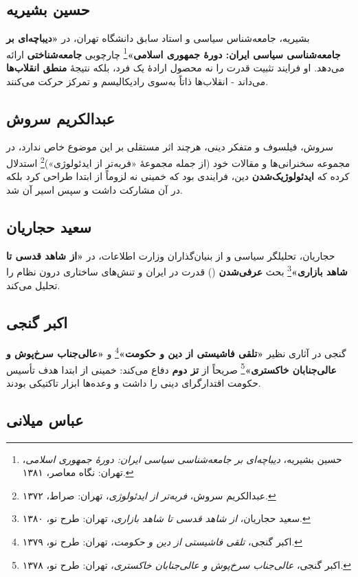 \documentclass[12pt,a4paper]{book}
\newcommand{\keyword}[1]{\textbf{\textcolor{cPrimary}{#1}}}
\newcommand{\en}[1]{\lr{\textit{#1}}}
\begin{document}
\subsection{حسین بشیریه}

بشیریه، جامعه‌شناس سیاسی و استاد سابق دانشگاه تهران، در \textbf{«دیباچه‌ای بر جامعه‌شناسی سیاسی ایران: دورهٔ جمهوری اسلامی»}\footnote{حسین بشیریه، \textit{دیباچه‌ای بر جامعه‌شناسی سیاسی ایران: دورهٔ جمهوری اسلامی}، تهران: نگاه معاصر، ۱۳۸۱.} چارچوبی \keyword{جامعه‌شناختی} ارائه می‌دهد. او فرایند تثبیت قدرت را نه محصول ارادهٔ یک فرد، بلکه نتیجهٔ \keyword{منطق انقلاب‌ها} می‌داند - انقلاب‌ها ذاتاً به‌سوی رادیکالیسم و تمرکز حرکت می‌کنند.

\subsection{عبدالکریم سروش}

سروش، فیلسوف و متفکر دینی، هرچند اثر مستقلی بر این موضوع خاص ندارد، در مجموعه سخنرانی‌ها و مقالات خود (از جمله مجموعهٔ «فربه‌تر از ایدئولوژی»)\footnote{عبدالکریم سروش، \textit{فربه‌تر از ایدئولوژی}، تهران: صراط، ۱۳۷۲.} استدلال کرده که \keyword{ایدئولوژیک‌شدن} دین، فرایندی بود که خمینی نه لزوماً از ابتدا طراحی کرد بلکه در آن مشارکت داشت و سپس اسیر آن شد.

\subsection{سعید حجاریان}

حجاریان، تحلیلگر سیاسی و از بنیان‌گذاران وزارت اطلاعات، در \textbf{«از شاهد قدسی تا شاهد بازاری»}\footnote{سعید حجاریان، \textit{از شاهد قدسی تا شاهد بازاری}، تهران: طرح نو، ۱۳۸۰.} بحث \keyword{عرفی‌شدن} (\en{secularization}) قدرت در ایران و تنش‌های ساختاری درون نظام را تحلیل می‌کند.

\subsection{اکبر گنجی}

گنجی در آثاری نظیر \textbf{«تلقی فاشیستی از دین و حکومت»}\footnote{اکبر گنجی، \textit{تلقی فاشیستی از دین و حکومت}، تهران: طرح نو، ۱۳۷۹.} و \textbf{«عالی‌جناب سرخ‌پوش و عالی‌جنابان خاکستری»}\footnote{اکبر گنجی، \textit{عالی‌جناب سرخ‌پوش و عالی‌جنابان خاکستری}، تهران: طرح نو، ۱۳۷۸.} صریحاً از \keyword{تز دوم} دفاع می‌کند: خمینی از ابتدا هدف تأسیس حکومت اقتدارگرای دینی را داشت و وعده‌ها ابزار تاکتیکی بودند.

\subsection{عباس میلانی}
\end{document}
